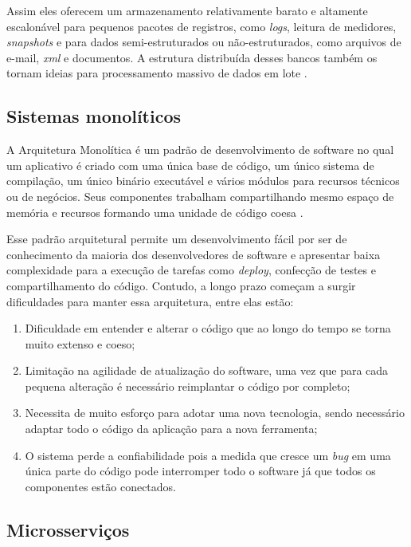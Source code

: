 Assim eles oferecem um armazenamento relativamente barato e altamente escalonável
para pequenos pacotes de registros, como \textit{logs}, leitura de medidores,
\textit{snapshots} e para dados semi-estruturados ou não-estruturados, como arquivos
de e-mail, \textit{xml} e documentos. A estrutura distribuída desses bancos também
os tornam ideias para processamento massivo de dados em lote \cite{NewEraOfDatabases}.

\subsection{Sistemas monolíticos}

A Arquitetura Monolítica é um padrão de desenvolvimento de software no qual um aplicativo
é criado com uma única base de código, um único sistema de compilação, um único binário
executável e vários módulos para recursos técnicos ou de negócios. Seus componentes
trabalham compartilhando mesmo espaço de memória e recursos formando uma unidade de
código coesa \cite{NatalliaSakovich}.

Esse padrão arquitetural permite um desenvolvimento fácil por ser de conhecimento
da maioria dos desenvolvedores de software e apresentar baixa complexidade para a
execução de tarefas como \textit{deploy}, confecção de testes e compartilhamento
do código. Contudo, a longo prazo começam a surgir dificuldades para manter essa
arquitetura, entre elas estão:

  \begin{enumerate}
    \item Dificuldade em entender e alterar o código que ao longo do tempo se torna
    muito extenso e coeso;
    \item Limitação na agilidade de atualização do software, uma vez que para cada
    pequena alteração é necessário reimplantar o código por completo;
    \item Necessita de muito esforço para adotar uma nova tecnologia, sendo
    necessário adaptar todo o código da aplicação para a nova ferramenta;
    \item O sistema perde a confiabilidade pois a medida que cresce um \textit{bug}
    em uma única parte do código pode interromper todo o software já que todos os
    componentes estão conectados.
  \end{enumerate}

\subsection{Microsserviços}

